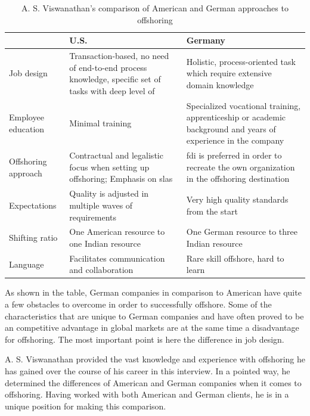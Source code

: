\vspace{3mm}
\begin{table}[htb]
	\centering
	\begin{tabular}{l|p{5.55cm}|p{5.55cm}}
		& \textbf{U.S.} & \textbf{Germany}\\\hline
		\rule{0pt}{3ex}Job design& Transaction-based, no need of end-to-end process knowledge, specific set of tasks with deep level of  &Holistic, process-oriented task which require extensive domain knowledge\\ \hline
		\rule{0pt}{3ex}Employee education&Minimal training &Specialized vocational training, apprenticeship or academic background and years of experience in the company \\ \hline
		\rule{0pt}{3ex}Offshoring approach&Contractual and legalistic focus when setting up offshoring; Emphasis on \glspl{sla} &\gls{fdi} is preferred in order to recreate the own organization in the offshoring destination \\ \hline
		\rule{0pt}{3ex}Expectations&Quality is adjusted in multiple waves of requirements &Very high quality standards from the start\\ \hline
		\rule{0pt}{3ex}Shifting ratio& One American resource to one Indian resource & One German resource to three Indian resource\\ \hline
		\rule{0pt}{3ex}Language&Facilitates communication and collaboration &Rare skill offshore, hard to learn \\ \hline
	\end{tabular}
	\vspace{3mm}
	\caption{A. S. Viswanathan's comparison of American and German approaches to offshoring}
	\label{tab:ViswanathanComparison}
\end{table}

As shown in the table, German companies in comparison to American have quite a few obstacles to overcome in order to successfully offshore. Some of the characteristics that are unique to German companies and have often proved to be an competitive advantage in global markets are at the same time a disadvantage for offshoring. The most important point is here the difference in job design. 

A. S. Viswanathan provided the vast knowledge and experience with offshoring he has gained over the course of his career in this interview. In a pointed way, he determined the differences of American and German companies when it comes to offshoring. Having worked with both American and German clients, he is in a unique position for making this comparison.

